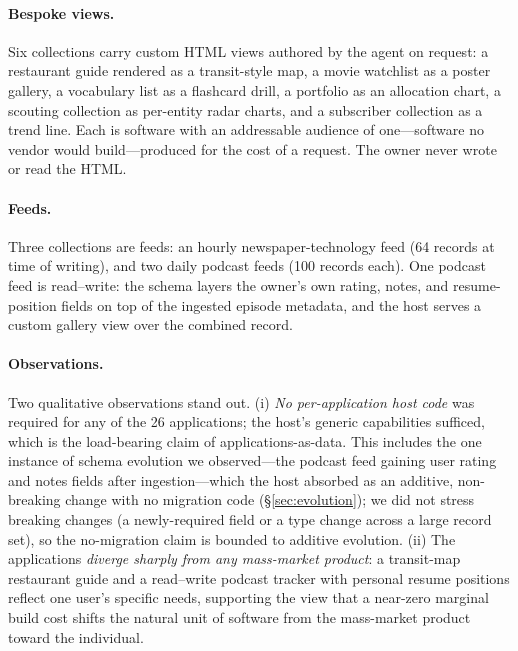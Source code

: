 \documentclass[11pt]{article}
\begin{document}
\paragraph{Bespoke views.}
Six collections carry custom HTML views authored by the agent on request: a
restaurant guide rendered as a transit-style map, a movie watchlist as a poster
gallery, a vocabulary list as a flashcard drill, a portfolio as an allocation
chart, a scouting collection as per-entity radar charts, and a subscriber
collection as a trend line. Each is software with an addressable audience of
one---software no vendor would build---produced for the cost of a request. The
owner never wrote or read the HTML.

\paragraph{Feeds.}
Three collections are feeds: an hourly newspaper-technology feed (64 records at
time of writing), and two daily podcast feeds (100 records each). One podcast feed
is read--write: the schema layers the owner's own rating, notes, and
resume-position fields on top of the ingested episode metadata, and the host
serves a custom gallery view over the combined record.

\paragraph{Observations.}
Two qualitative observations stand out. (i) \emph{No per-application host code} was
required for any of the 26 applications; the host's generic capabilities sufficed,
which is the load-bearing claim of applications-as-data. This includes the one
instance of schema evolution we observed---the podcast feed gaining user rating and
notes fields after ingestion---which the host absorbed as an additive,
non-breaking change with no migration code (\S\ref{sec:evolution}); we did not
stress breaking changes (a newly-required field or a type change across a large
record set), so the no-migration claim is bounded to additive evolution. (ii) The applications
\emph{diverge sharply from any mass-market product}: a transit-map restaurant
guide and a read--write podcast tracker with personal resume positions reflect one
user's specific needs, supporting the view that a near-zero marginal build cost
shifts the natural unit of software from the mass-market product toward the
individual.

\end{document}
